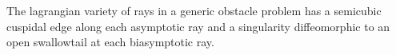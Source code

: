 The lagrangian variety of rays in a generic obstacle problem has a semicubic cuspidal edge along each asymptotic ray and a singularity diffeomorphic to an open swallowtail at each biasymptotic ray.
